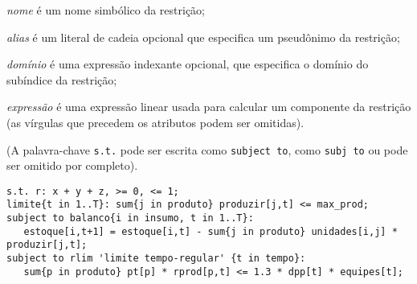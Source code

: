\documentclass[11pt, brazil]{report}
\def\para#1{\noindent{\bf#1}}
\begin{document}
\medskip

\noindent
{\it nome} é um nome simbólico da restrição;

\noindent
{\it alias} é um literal de cadeia opcional que especifica um pseudônimo
da restrição;

\noindent
{\it domínio} é uma expressão indexante opcional, que especifica
o domínio do subíndice da restrição;

\noindent
{\it expressão} é uma expressão linear usada para calcular um componente
da restrição (as vírgulas que precedem os atributos podem ser omitidas).

\noindent
(A palavra-chave {\tt s.t.} pode ser escrita como {\tt subject to}, como
{\tt subj to} ou pode ser omitido por completo).


%
%
%
%
%
%
%
%
%
%
%
%
%
%


\para{Exemplos}


\begin{verbatim}
s.t. r: x + y + z, >= 0, <= 1;
limite{t in 1..T}: sum{j in produto} produzir[j,t] <= max_prod;
subject to balanco{i in insumo, t in 1..T}:
   estoque[i,t+1] = estoque[i,t] - sum{j in produto} unidades[i,j] * produzir[j,t];
subject to rlim 'limite tempo-regular' {t in tempo}:
   sum{p in produto} pt[p] * rprod[p,t] <= 1.3 * dpp[t] * equipes[t];
\end{verbatim}
\end{document}
